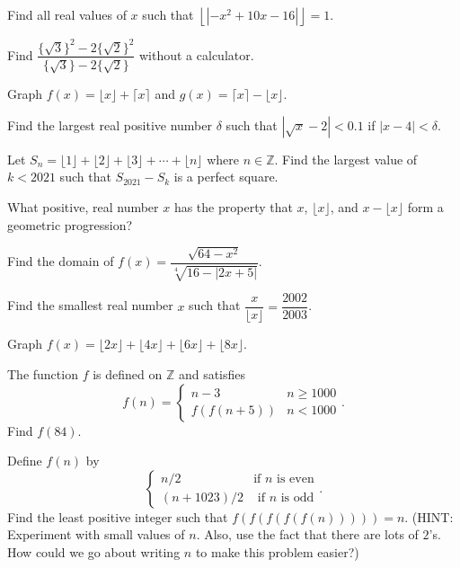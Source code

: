 \documentclass[lang=en,11pt]{elegantbook}
\begin{document}
\begin{challengeset}
\item Find all real values of $x$ such that $\left\lfloor{\left|-x^2+10x-16\right|}\right\rfloor=1$. \vspace{3mm}
\item Find $\dfrac{\{\sqrt{3}\}^2-2\{\sqrt{2}\}^2}{\{\sqrt{3}\}-2\{\sqrt{2}\}}$ without a calculator. \vspace{3mm}
\item Graph $f(x)=\lfloor{x}\rfloor+\lceil{x}\rceil$ and $g(x)=\lceil{x}\rceil-\lfloor{x}\rfloor$. \vspace{3mm}
\item Find the largest real positive number $\delta$ such that $\left|\sqrt{x}-2\right|<0.1$ if $|x-4|<\delta$. \vspace{3mm}
\item Let $S_n=\lfloor{1}\rfloor+\lfloor{2}\rfloor+\lfloor{3}\rfloor+\cdots+\lfloor{n}\rfloor$ where $n\in\mathbb{Z}$.  Find the largest value of $k<2021$ such that $S_{2021}-S_k$ is a perfect square. \vspace{3mm}
\item What positive, real number $x$ has the property that $x$, $\lfloor{x}\rfloor$, and $x-\lfloor{x}\rfloor$ form a geometric progression?\vspace{3mm}
\item Find the domain of $f(x)=\dfrac{\sqrt{64-x^2}}{\sqrt[4]{16-|2x+5|}}$. \vspace{3mm}
\item Find the smallest real number $x$ such that $\dfrac{x}{\lfloor{x}\rfloor}=\dfrac{2002}{2003}$. \vspace{3mm}
\item Graph $f(x)=\lfloor{2x}\rfloor+\lfloor{4x}\rfloor+\lfloor{6x}\rfloor+\lfloor{8x}\rfloor$. \vspace{3mm}
\item The function $f$ is defined on $\mathbb{Z}$ and satisfies $$f(n)=\begin{cases} n-3 & n\geq 1000 \\ f(f(n+5)) & n<1000\end{cases}.$$  Find $f(84)$. \vspace{3mm}
\item Define $f(n)$ by $$\begin{cases} n/2 & \text{if } n \text{ is even} \\ (n+1023)/2 & \text{ if } n \text{ is odd} \end{cases}.$$  Find the least positive integer such that $f(f(f(f(f(n)))))=n$. (HINT: Experiment with small values of $n$.  Also, use the fact that there are lots of $2$'s.  How could we go about writing $n$ to make this problem easier?) \vspace{3mm}
\end{challengeset}
\end{document}

